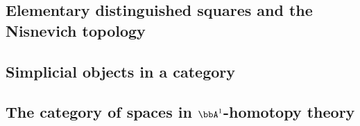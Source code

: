 \subsection{Elementary distinguished squares and the Nisnevich topology}













\subsection{Simplicial objects in a category}













\subsection{The category of spaces in \texorpdfstring{$\bbA^1$}{A1}-homotopy theory}



